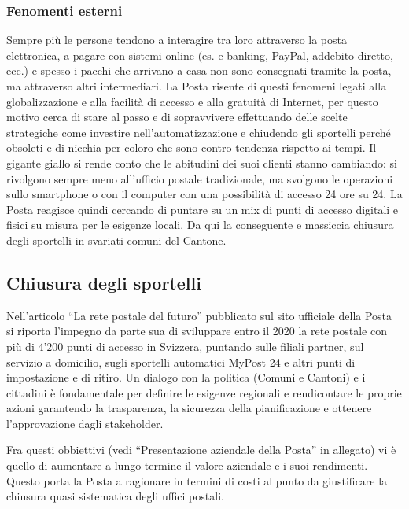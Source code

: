 \subsubsection{Fenomenti esterni}
Sempre più le persone tendono a interagire tra loro attraverso la posta elettronica, a pagare con sistemi online (es. e-banking, PayPal, addebito diretto, ecc.) e spesso i pacchi che arrivano a casa non sono consegnati tramite la posta, ma attraverso altri intermediari.
La Posta risente di questi fenomeni legati alla globalizzazione e alla facilità di accesso e alla gratuità di Internet, per questo motivo cerca di stare al passo e di sopravvivere effettuando delle scelte strategiche come investire nell’automatizzazione e chiudendo gli sportelli perché obsoleti e di nicchia per coloro che sono contro tendenza rispetto ai tempi.
Il gigante giallo si rende conto che le abitudini dei suoi clienti stanno cambiando: si rivolgono sempre meno all’ufficio postale tradizionale, ma svolgono le operazioni sullo smartphone o con il computer con una possibilità di accesso 24 ore su 24. La Posta reagisce quindi cercando di puntare su un mix di punti di accesso digitali e fisici su misura per le esigenze locali. Da qui la conseguente e massiccia chiusura degli sportelli in svariati comuni del Cantone.

\subsection{Chiusura degli sportelli}
Nell’articolo “La rete postale del futuro” pubblicato sul sito ufficiale della Posta si riporta l’impegno da parte sua di sviluppare entro il 2020 la rete postale con più di 4’200 punti di accesso in Svizzera, puntando sulle filiali partner, sul servizio a domicilio, sugli sportelli automatici MyPost 24 e altri punti di impostazione e di ritiro. 
Un dialogo con la politica (Comuni e Cantoni) e i cittadini è fondamentale per definire le esigenze regionali e rendicontare le proprie azioni garantendo la trasparenza, la sicurezza della pianificazione e ottenere l’approvazione dagli stakeholder.

Fra questi obbiettivi (vedi “Presentazione aziendale della Posta” in allegato) vi è quello di aumentare a lungo termine il valore aziendale e i suoi rendimenti. Questo porta la Posta a ragionare in termini di costi al punto da giustificare la chiusura quasi sistematica degli uffici postali.
